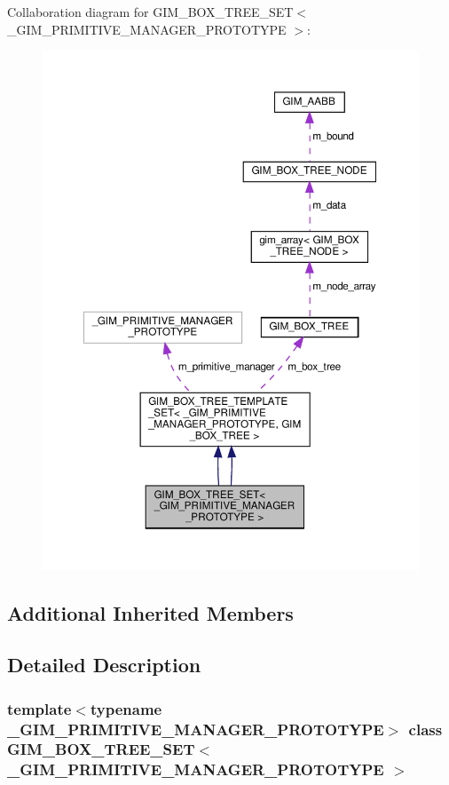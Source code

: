 Collaboration diagram for G\+I\+M\+\_\+\+B\+O\+X\+\_\+\+T\+R\+E\+E\+\_\+\+S\+ET$<$ \+\_\+\+G\+I\+M\+\_\+\+P\+R\+I\+M\+I\+T\+I\+V\+E\+\_\+\+M\+A\+N\+A\+G\+E\+R\+\_\+\+P\+R\+O\+T\+O\+T\+Y\+PE $>$\+:
\nopagebreak
\begin{figure}[H]
\begin{center}
\leavevmode
\includegraphics[width=350pt]{classGIM__BOX__TREE__SET__coll__graph}
\end{center}
\end{figure}
\subsection*{Additional Inherited Members}


\subsection{Detailed Description}
\subsubsection*{template$<$typename \+\_\+\+G\+I\+M\+\_\+\+P\+R\+I\+M\+I\+T\+I\+V\+E\+\_\+\+M\+A\+N\+A\+G\+E\+R\+\_\+\+P\+R\+O\+T\+O\+T\+Y\+PE$>$\newline
class G\+I\+M\+\_\+\+B\+O\+X\+\_\+\+T\+R\+E\+E\+\_\+\+S\+E\+T$<$ \+\_\+\+G\+I\+M\+\_\+\+P\+R\+I\+M\+I\+T\+I\+V\+E\+\_\+\+M\+A\+N\+A\+G\+E\+R\+\_\+\+P\+R\+O\+T\+O\+T\+Y\+P\+E $>$}

